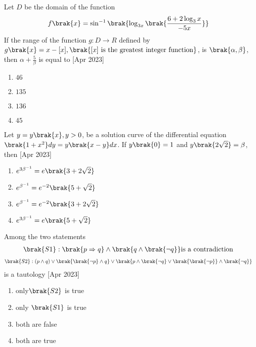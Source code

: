 \item Let $D$ be the domain of the function 
\begin{align*}
    f\brak{x}=\sin^{-1}{\brak{\log_{3x}\brak{\frac{6+2\log_3 x}{-5x}}}}
\end{align*}If the range of the function $g:D\rightarrow R$ defined by $g\brak{x}=x-[x],\brak{[x]\text{ is the greatest  integer function}}$, is $\brak{\alpha,\beta}$, then $\alpha+\frac{5}{\beta}$ is equal to \hfill[Apr 2023]
\begin{multicols}{2}
\begin{enumerate}
       \item $46$
       \item $135$
       \item $136$
       \item $45$
\end{enumerate}
\end{multicols}

\item Let $y=y\brak{x},y>0$, be a solution curve of the differential equation $\brak{1+x^2}dy=y\brak{x-y}dx$. If $y\brak{0}=1$ and $y\brak{2\sqrt{2}}=\beta$, then \hfill[Apr 2023]
\begin{enumerate}
    \item $e^{3\beta^{-1}}=e\brak{3+2\sqrt{2}}$
    \item $e^{\beta^{-1}}=e^{-2}\brak{5+\sqrt{2}}$
    \item $e^{\beta^{-1}}=e^{-2}\brak{3+2\sqrt{2}}$
    \item $e^{3\beta^{-1}}=e\brak{5+\sqrt{2}}$
\end{enumerate}

\item Among the two statements 
\begin{align*}
    \brak{S1}:\brak{p\Rightarrow q}\land \brak{q\land\brak{\neg q}} \text{is a contradiction}
\end{align*}
\begin{align*}
    \brak{S2}:(p\land q)\lor \brak{\brak{\neg p}\land q}\lor\brak{p \land \brak{\neg q}\lor \brak{\brak{\neg p}}\land\brak{\neg q}}
\end{align*}
is a tautology \hfill[Apr 2023]
\begin{multicols}{2}
\begin{enumerate}
    \item only$\brak{S2}$ is true
    \item only $\brak{S1}$ is true 
    \item both are false 
    \item both are true 
\end{enumerate}
\end{multicols}

